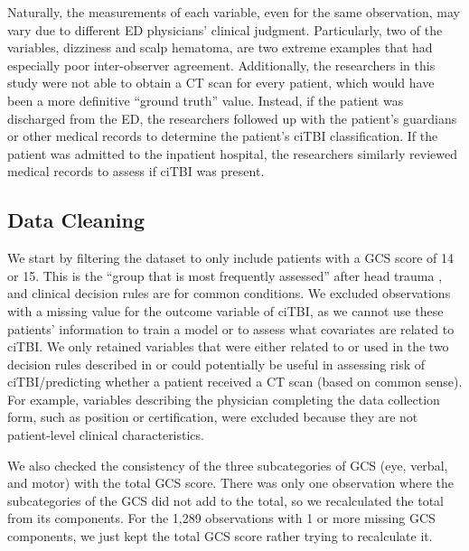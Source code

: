 \documentclass[10pt,letterpaper]{article}
\begin{document}
Naturally, the measurements of each variable, even for the same observation, may vary due to different ED physicians' clinical judgment. Particularly, two of the variables, dizziness and scalp hematoma, are two extreme examples that had especially poor inter-observer agreement.
Additionally, the researchers in this study were not able to obtain a CT scan for every patient, which would have been a more definitive ``ground truth'' value. Instead, if the patient was discharged
from the ED, the researchers followed up with the patient's guardians or other medical records to determine the patient's ciTBI classification. If the patient was admitted to the inpatient hospital, the researchers similarly reviewed medical records
to assess if ciTBI was present.


\subsection{Data Cleaning}\label{data-cleaning}

We start by filtering the dataset to only include patients with a GCS score of 14 or 15. This is the ``group that is most frequently assessed'' after head trauma \cite{Kuppermann2009}, and clinical decision rules are for common conditions.
We excluded observations with a missing value for the outcome variable of ciTBI, as we cannot use these patients' information to train a model or to assess what covariates are related to ciTBI.
We only retained variables that were either related to or used in the two decision rules described in \cite{Kuppermann2009} or could potentially be useful in assessing risk of ciTBI\slash predicting whether a patient received a CT scan (based on common sense).
For example, variables describing the physician completing the data collection form, such as position or certification, were excluded because they are not patient-level clinical characteristics.

We also checked the consistency of the three subcategories of GCS (eye, verbal, and motor) with the total GCS score.
There was only one observation where the subcategories of the GCS did not add to the total, so we recalculated the total from its components.
For the 1,289 observations with 1 or more missing GCS components, we just kept the total GCS score rather trying to recalculate it.
\end{document}
